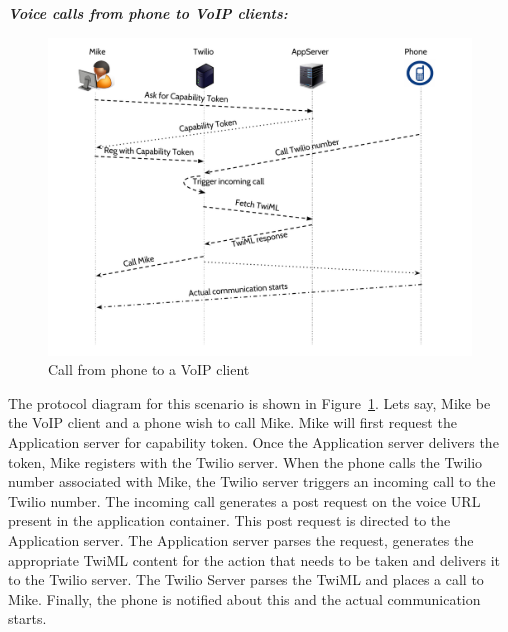 \emph{\textbf{Voice calls from phone to VoIP clients:} }
\begin{figure}[t!] 
\centering
  \includegraphics[width=\textwidth]{figs/p2c.pdf}
\caption{Call from phone to a VoIP client}
\label{fig:callfromphone}
\end{figure}
The protocol diagram for this scenario is shown in Figure~\ref{fig:callfromphone}. Lets say, Mike be the VoIP client and a phone wish to call Mike. Mike will first request the Application server for capability token. Once the Application server delivers the token, Mike registers with the Twilio server. When the phone calls the Twilio number associated with Mike, the Twilio server triggers an incoming call to the Twilio number. The incoming call generates a post request on the voice URL present in the application container. This post request is directed to the Application server. The Application server parses the request, generates the appropriate TwiML content for the action that needs to be taken and delivers it to the Twilio server. The Twilio Server parses the TwiML and places a call to Mike. Finally, the phone is notified about this and the actual communication starts.

